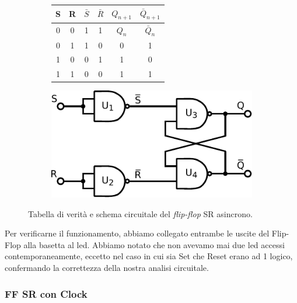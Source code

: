 \begin{savenotes}
\begin{figure}[htpc]
\centering
	\begin{subfigure}[hc]{.4\textwidth}
		\centering
		{\renewcommand{\arraystretch}{1.1}%
		\begin{tabular}{|c|c|c|c|c|c|}
		\hline
		S & R & $\bar S$ & $\bar R$ & $Q_{n+1}$ & $\bar Q_{n+1}$ \\
		\hline \hline
		0 & 0 & 1 & 1 & $Q_n$ & $\bar Q_n$\\
		\hline
		0 & 1 & 1 & 0 &  0  &  1\\
		\hline
		1 & 0 & 0 & 1 &  1  &  0\\
		\hline
		1 & 1 & 0 & 0 & 1 & 1\\
		\hline
		\end{tabular}}
		\label{tab11:FFSR}
        \end{subfigure}
        \begin{subfigure}[hc]{.4\textwidth}
		\centering
		\includegraphics[width=.7\textwidth]{../E11/latex/FF-SR-async.pdf}
		\caption{}
		\label{cir11:FF-SR-a}
        \end{subfigure}
\caption{Tabella di verità e schema circuitale del \textit{flip-flop} SR asincrono.}
\end{figure}
\end{savenotes}

Per verificarne il funzionamento, abbiamo collegato entrambe le uscite del Flip-Flop alla basetta al led.
Abbiamo notato che non avevamo mai due led accessi contemporaneamente, eccetto nel caso in cui sia Set che Reset erano ad 1 logico, confermando la correttezza della nostra analisi circuitale.

\subsubsection*{FF SR con Clock}


